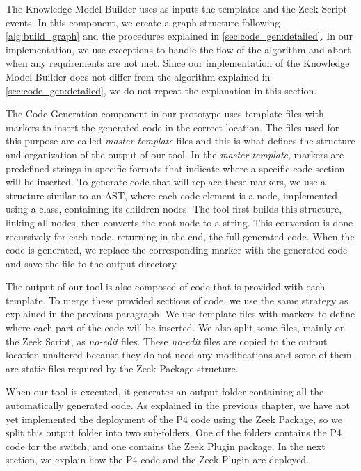The Knowledge Model Builder uses as inputs the templates and the Zeek Script events. In this component, we create a graph structure following \autoref{alg:build_graph} and the procedures explained in \autoref{sec:code_gen:detailed}. In our implementation, we use exceptions to handle the flow of the algorithm and abort when any requirements are not met. Since our implementation of the Knowledge Model Builder does not differ from the algorithm explained in \autoref{sec:code_gen:detailed}, we do not repeat the explanation in this section.

The Code Generation component in our prototype uses template files with markers to insert the generated code in the correct location. The files used for this purpose are called \textit{master template} files and this is what defines the structure and organization of the output of our tool. In the \textit{master template}, markers are predefined strings in specific formats that indicate where a specific code section will be inserted. To generate code that will replace these markers, we use a structure similar to an AST, where each code element is a node, implemented using a class, containing its children nodes. The tool first builds this structure, linking all nodes, then converts the root node to a string. This conversion is done recursively for each node, returning in the end, the full generated code. When the code is generated, we replace the corresponding marker with the generated code and save the file to the output directory.

The output of our tool is also composed of code that is provided with each template. To merge these provided sections of code, we use the same strategy as explained in the previous paragraph. We use template files with markers to define where each part of the code will be inserted. We also split some files, mainly on the Zeek Script, as \textit{no-edit} files. These \textit{no-edit} files are copied to the output location unaltered because they do not need any modifications and some of them are static files required by the Zeek Package structure.

When our tool is executed, it generates an output folder containing all the automatically generated code. As explained in the previous chapter, we have not yet implemented the deployment of the P4 code using the Zeek Package, so we split this output folder into two sub-folders. One of the folders contains the P4 code for the switch, and one contains the Zeek Plugin package. In the next section, we explain how the P4 code and the Zeek Plugin are deployed.

